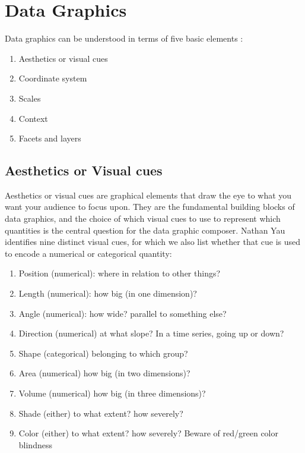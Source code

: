 \documentclass[]{book}
\providecommand{\tightlist}{%
  \setlength{\itemsep}{0pt}\setlength{\parskip}{0pt}}
\providecommand{\tightlist}{%
  \setlength{\itemsep}{0pt}\setlength{\parskip}{0pt}}
\theoremstyle{definition}
\theoremstyle{definition}
\theoremstyle{definition}
\theoremstyle{remark}
\begin{document}
\chapter{Data Graphics}\label{data-graphics}

Data graphics can be understood in terms of five basic elements
\citep{baumer2017mdsr}:

\begin{enumerate}
\def\labelenumi{\arabic{enumi}.}
\tightlist
\item
  Aesthetics or visual cues
\item
  Coordinate system
\item
  Scales
\item
  Context
\item
  Facets and layers
\end{enumerate}

\section{Aesthetics or Visual cues}\label{aesthetics-or-visual-cues}

Aesthetics or visual cues are graphical elements that draw the eye to
what you want your audience to focus upon. They are the fundamental
building blocks of data graphics, and the choice of which visual cues to
use to represent which quantities is the central question for the data
graphic composer. Nathan Yau identifies nine distinct visual cues, for
which we also list whether that cue is used to encode a numerical or
categorical quantity:

\begin{enumerate}
\def\labelenumi{\arabic{enumi}.}
\tightlist
\item
  Position (numerical): where in relation to other things?
\item
  Length (numerical): how big (in one dimension)?
\item
  Angle (numerical): how wide? parallel to something else?
\item
  Direction (numerical) at what slope? In a time series, going up or
  down?
\item
  Shape (categorical) belonging to which group?
\item
  Area (numerical) how big (in two dimensions)?
\item
  Volume (numerical) how big (in three dimensions)?
\item
  Shade (either) to what extent? how severely?
\item
  Color (either) to what extent? how severely? Beware of red/green color
  blindness
\end{enumerate}
\end{document}

